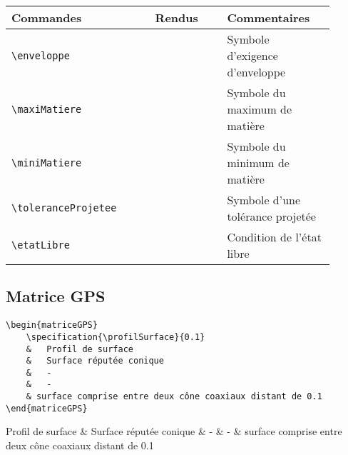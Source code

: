 \documentclass[a4paper,12pt]{article}
\begin{document}
			\noindent
			\begin{tabular}{|p{0.4\linewidth}|p{0.2\linewidth}|p{0.3\linewidth}|}
				\hline
					\textbf{Commandes}&\textbf{Rendus}&\textbf{Commentaires}
				\\\hline\hline
					\verb!\enveloppe!	&	\enveloppe	&	Symbole d'exigence d'enveloppe
				\\\hline
					\verb!\maxiMatiere!	&	\maxiMatiere	&	Symbole du maximum de matière
				\\\hline
					\verb!\miniMatiere!	&	\miniMatiere	&	Symbole du minimum de matière
				\\\hline
					\verb!\toleranceProjetee!&	\toleranceProjetee	&Symbole d'une tolérance projetée
				\\\hline
					\verb!\etatLibre!	&	\etatLibre	&	Condition de l'état libre
				\\\hline
			\end{tabular}

			
		\subsection{Matrice GPS}
			\begin{verbatim}
\begin{matriceGPS}
	\specification{\profilSurface}{0.1}
	&	Profil de surface
	&	Surface réputée conique
	&	-
	&	-
	& surface comprise entre deux cône coaxiaux distant de 0.1
\end{matriceGPS}
			\end{verbatim}
			\begin{matriceGPS}
				{}
					Profil de surface
				&	Surface réputée conique
				&	-
				&	-
				& surface comprise entre deux cône coaxiaux distant de 0.1
			\end{matriceGPS}
		
\end{document}
